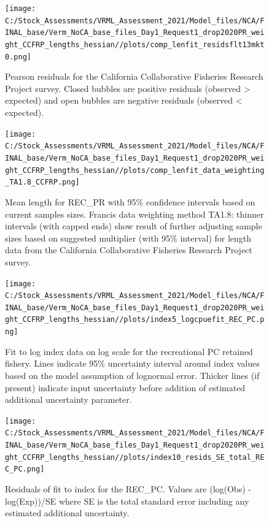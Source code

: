 \documentclass[
  english,
  a4paper,
]{article}
\begin{document}
\begin{figure}
\centering
\texttt{[image: C:/Stock\_Assessments/VRML\_Assessment\_2021/Model\_files/NCA/FINAL\_base/Verm\_NoCA\_base\_files\_Day1\_Request1\_drop2020PR\_weight\_CCFRP\_lengths\_hessian//plots/comp\_lenfit\_residsflt13mkt0.png]}
\caption{Pearson residuals for the California Collaborative Fisheries Research Project survey. Closed bubbles are positive residuals (observed \textgreater{} expected) and open bubbles are negative residuals (observed \textless{} expected).\label{fig:len-pearson-CCFRP}}
\end{figure}

\begin{figure}
\centering
\texttt{[image: C:/Stock\_Assessments/VRML\_Assessment\_2021/Model\_files/NCA/FINAL\_base/Verm\_NoCA\_base\_files\_Day1\_Request1\_drop2020PR\_weight\_CCFRP\_lengths\_hessian//plots/comp\_lenfit\_data\_weighting\_TA1.8\_CCFRP.png]}
\caption{Mean length for REC\_PR with 95\% confidence intervals based on current samples sizes. Francis data weighting method TA1.8: thinner intervals (with capped ends) show result of further adjusting sample sizes based on suggested multiplier (with 95\% interval) for length data from the California Collaborative Fisheries Research Project survey.\label{fig:mean-len-fit-CCFRP}}
\end{figure}

\FloatBarrier

\FloatBarrier

\begin{figure}
\centering
\texttt{[image: C:/Stock\_Assessments/VRML\_Assessment\_2021/Model\_files/NCA/FINAL\_base/Verm\_NoCA\_base\_files\_Day1\_Request1\_drop2020PR\_weight\_CCFRP\_lengths\_hessian//plots/index5\_logcpuefit\_REC\_PC.png]}
\caption{Fit to log index data on log scale for the recreational PC retained fishery. Lines indicate 95\% uncertainty interval around index values based on the model assumption of lognormal error. Thicker lines (if present) indicate input uncertainty before addition of estimated additional uncertainty parameter.\label{fig:log-cpue-REC-PC}}
\end{figure}

\begin{figure}
\centering
\texttt{[image: C:/Stock\_Assessments/VRML\_Assessment\_2021/Model\_files/NCA/FINAL\_base/Verm\_NoCA\_base\_files\_Day1\_Request1\_drop2020PR\_weight\_CCFRP\_lengths\_hessian//plots/index10\_resids\_SE\_total\_REC\_PC.png]}
\caption{Residuals of fit to index for the REC\_PC. Values are (log(Obs) - log(Exp))/SE where SE is the total standard error including any estimated additional uncertainty.\label{fig:cpue-resid-REC-PC}}
\end{figure}
\end{document}

